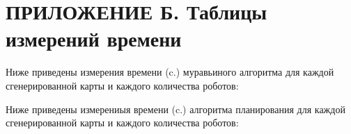 \documentclass{article}
\numberwithin{equation}{section}
\begin{document}
    \newpage
	\section*{ПРИЛОЖЕНИЕ Б. Таблицы измерений времени} \label{sec:time}
	Ниже приведены измерения времени (c.) муравьиного алгоритма для каждой сгенерированной карты и каждого количества роботов:

	
	
	
	
	
	

	Ниже приведены измерениыя времени (c.) алгоритма планирования для каждой сгенерированной карты и каждого количества роботов:

	
	
	
	
	
	

    \newpage
\end{document}
